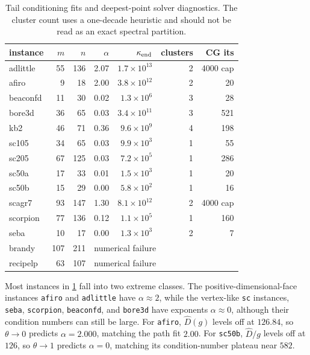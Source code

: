\begin{table}[ht]
\centering
\small
\begin{tabular}{@{}lrrrrrr@{}}
\toprule
instance & $m$ & $n$ & $\alpha$ & $\kappa_{\rm end}$ & clusters & CG its \\
\midrule
adlittle  & 55  & 136 & 2.07 & $1.7\!\times\!10^{13}$ & 2 & 4000 cap \\
afiro     & 9   & 18  & 2.00 & $3.8\!\times\!10^{12}$ & 2 & 20 \\
beaconfd  & 11  & 30  & 0.02 & $1.3\!\times\!10^6$  & 3 & 28 \\
bore3d    & 36  & 65  & 0.03 & $3.4\!\times\!10^{11}$ & 3 & 521 \\
kb2       & 46  & 71  & 0.36 & $9.6\!\times\!10^9$  & 4 & 198 \\
sc105     & 34  & 65  & 0.03 & $9.9\!\times\!10^3$  & 1 & 55 \\
sc205     & 67  & 125 & 0.03 & $7.2\!\times\!10^5$  & 1 & 286 \\
sc50a     & 17  & 33  & 0.01 & $1.5\!\times\!10^3$  & 1 & 20 \\
sc50b     & 15  & 29  & 0.00 & $5.8\!\times\!10^2$  & 1 & 16 \\
scagr7    & 93  & 147 & 1.30 & $8.1\!\times\!10^{12}$ & 2 & 4000 cap \\
scorpion  & 77  & 136 & 0.12 & $1.1\!\times\!10^5$  & 1 & 160 \\
seba      & 10  & 17  & 0.00 & $1.3\!\times\!10^3$  & 2 & 7 \\
brandy    & 107 & 211 & \multicolumn{4}{l}{numerical failure} \\
recipelp  & 63  & 107 & \multicolumn{4}{l}{numerical failure} \\
\bottomrule
\end{tabular}
\caption{Tail conditioning fits and deepest-point solver diagnostics.  The
cluster count uses a one-decade heuristic and should not be read as an exact
spectral partition.}
\label{tab:netlib-conditioning}
\end{table}

Most instances in \cref{tab:netlib-conditioning} fall into two extreme
classes.  The
positive-dimensional-face instances \texttt{afiro} and \texttt{adlittle}
have $\alpha\approx2$, while the vertex-like \texttt{sc} instances,
\texttt{seba}, \texttt{scorpion}, \texttt{beaconfd}, and \texttt{bore3d}
have exponents $\alpha\approx0$, although their condition numbers can
still be large.  For
\texttt{afiro}, $\widehat D(g)$ levels off at $126.84$, so $\theta\to0$ predicts
$\alpha=2.000$, matching the path fit $2.00$.  For \texttt{sc50b},
$\widehat D/g$ levels off at $126$, so $\theta\to1$ predicts $\alpha=0$, matching its
condition-number plateau near $582$.

